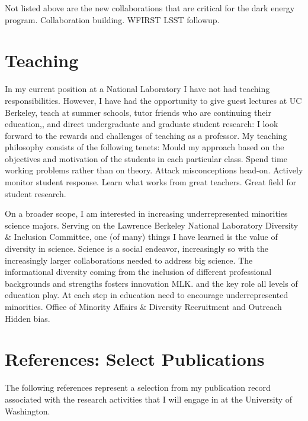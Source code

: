 \documentclass{article}
\begin{document}
Not listed above are the new collaborations that are critical for the dark energy program.
Collaboration building. WFIRST LSST followup.

\section{Teaching}
In my current position at a National Laboratory I have not had teaching responsibilities.  However,
I have had the opportunity to give guest lectures at UC Berkeley, teach at summer schools, tutor friends
who are continuing their education,, and direct undergraduate and graduate student research:
I look forward to the rewards and challenges of teaching as a professor. 
My teaching philosophy consists of the following tenets:
Mould my approach based on the objectives and motivation of the students in each particular class.
Spend time working problems rather than on theory.
Attack misconceptions head-on.
Actively monitor student response.
Learn what works from great teachers.
Great field for student research. 

On a broader scope, I am interested in increasing underrepresented minorities science majors.
Serving on the Lawrence Berkeley National Laboratory Diversity \& Inclusion Committee, one (of many) things I have
learned is the value of diversity in science.  Science is a social endeavor, increasingly so with
the increasingly larger collaborations needed to address big science.  The informational diversity
coming  from the inclusion of different professional backgrounds and strengths fosters innovation
MLK.
 and the key role all levels of education play.  At each step
in education need to encourage underrepresented minorities.
Office of Minority Affairs \& Diversity Recruitment and Outreach
Hidden bias.



\section{References: Select Publications}
The following references represent a selection from my publication record associated with the research
activities that I will engage in at the University of Washington.


\end{document}
